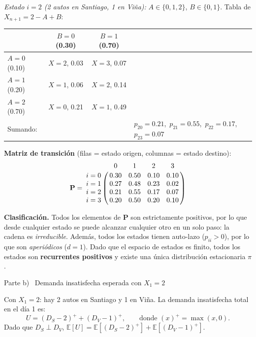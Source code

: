 \documentclass[10pt,a4paper]{article}
\newcommand{\E}[1]{\mathbb{E}\!\left[#1\right]}
\newcommand{\parteheader}[1]{%
  \vspace{8pt}\needspace{4cm}\noindent
  \begin{tcolorbox}[
    colback=subsecbg!18, colframe=subsecbg!55,
    sharp corners, boxrule=0.4pt,
    left=6pt, right=6pt, top=3pt, bottom=3pt,
    fontupper=\small\bfseries\sffamily,
  ]
  #1
  \end{tcolorbox}\vspace{2pt}%
}
\begin{document}
\noindent\textit{Estado $i=2$ (2 autos en Santiago, 1 en Vi\~na):}\quad
$A\in\{0,1,2\}$, $B\in\{0,1\}$. Tabla de $X_{n+1}=2-A+B$:

\begin{center}
  \begin{tabular}{l|cc|l}
    \toprule
                                 & $B=0$ (0.30)                                                  & $B=1$ (0.70) & \\
    \midrule
    $A=0$ (0.10)                 & $X=2$, 0.03                                                   & $X=3$, 0.07  & \\
    $A=1$ (0.20)                 & $X=1$, 0.06                                                   & $X=2$, 0.14  & \\
    $A=2$ (0.70)                 & $X=0$, 0.21                                                   & $X=1$, 0.49  & \\
    \midrule
    \multicolumn{3}{l}{Sumando:} & $p_{20}=0.21$,\ $p_{21}=0.55$,\ $p_{22}=0.17$,\ $p_{23}=0.07$                  \\
    \bottomrule
  \end{tabular}
\end{center}

\medskip
\textbf{Matriz de transici\'on} (filas = estado origen, columnas = estado destino):
\[
  \mathbf{P} =
  \bordermatrix{
    & 0    & 1    & 2    & 3    \cr
    i=0    & 0.30 & 0.50 & 0.10 & 0.10 \cr
    i=1    & 0.27 & 0.48 & 0.23 & 0.02 \cr
    i=2    & 0.21 & 0.55 & 0.17 & 0.07 \cr
    i=3    & 0.20 & 0.50 & 0.20 & 0.10 \cr
  }
\]

\medskip
\textbf{Clasificaci\'on.}\quad
Todos los elementos de $\mathbf{P}$ son estrictamente positivos, por lo que desde
cualquier estado se puede alcanzar cualquier otro en un solo paso: la cadena es
\emph{irreducible}. Adem\'as, todos los estados tienen auto-lazo ($p_{ii}>0$), por
lo que son \emph{aperi\'odicos} ($d=1$). Dado que el espacio de estados es finito,
todos los estados son \textbf{recurrentes positivos} y existe una \'unica
distribuci\'on estacionaria $\pi$.

\parteheader{Parte b) \textperiodcentered\ Demanda insatisfecha esperada con $X_1=2$}

Con $X_1=2$: hay 2 autos en Santiago y 1 en Vi\~na. La demanda insatisfecha total
en el d\'ia 1 es:
\[
  U = (D_S - 2)^+ + (D_V - 1)^+,
  \qquad \text{donde } (x)^+ = \max(x,0).
\]
Dado que $D_S \perp D_V$, $\E{U} = \E{(D_S-2)^+} + \E{(D_V-1)^+}$.
\end{document}
